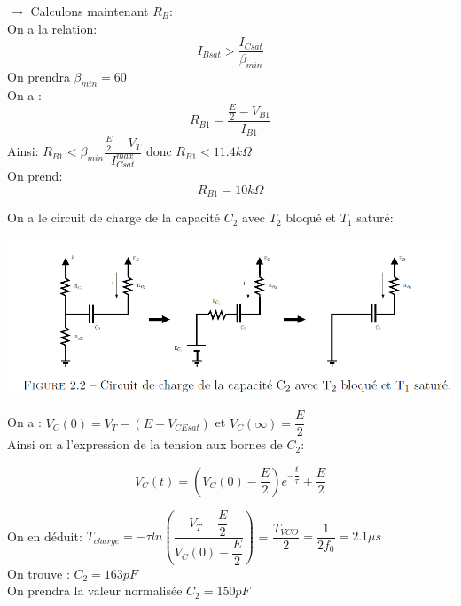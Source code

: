 \documentclass[a4paper]{report}
\begin{document}
\vspace{0.5cm}
$\rightarrow$ Calculons maintenant $R_B$:\\

On a la relation:
$$I_{Bsat} > \dfrac{I_{Csat}}{\beta _{min}}$$
On prendra $\beta _{min} =60$\\

On a :
$$R_{B1}=\dfrac{\frac{E}{2}-V_{B1}}{I_{B1}}$$
Ainsi: \hspace{2.5cm} $R_{B1} < \beta _{min} \dfrac{\frac{E}{2}-V_{T}}{I_{Csat}^{max}}$ \hspace{0.6cm} donc \hspace{0.6cm} $R_{B1}<11.4k \Omega$\\

On prend:
$$R_{B1} = 10k \Omega $$

On a le circuit de charge de la capacité $C_2$ avec $T_2$ bloqué et $T_1$ saturé:\\

\begin{center}
\includegraphics[width=1\textwidth]{circuitC2.PNG}
\end{center}


On a : \hspace{2cm} $V_C(0)=V_T-\left( E-V_{CEsat} \right)$ \hspace{2cm} et \hspace{2cm} $V_C(\infty)=\dfrac{E}{2}$\\

Ainsi on a l'expression de la tension aux bornes de $C_2$:

$$V_C(t)= \left( V_C(0)-\dfrac{E}{2} \right) e^{-\dfrac{t}{\tau}}+\dfrac{E}{2}$$

On en déduit: \hspace{3cm} $T_{charge}=-\tau ln \left( \dfrac{V_T-\dfrac{E}{2}}{V_C(0)-\dfrac{E}{2}} \right)$ = $\dfrac{T_{VCO}}{2}= \dfrac{1}{2f_0} = 2.1\mu s$\\
\vspace{0.2cm}
On trouve : \hspace{5cm} $C_2 = 163pF$\\
On prendra la valeur normalisée $C_2 = 150pF$\\
\end{document}
